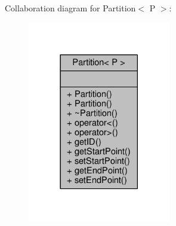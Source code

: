 Collaboration diagram for Partition$<$ P $>$\+:\nopagebreak
\begin{figure}[H]
\begin{center}
\leavevmode
\includegraphics[width=177pt]{classPartition__coll__graph}
\end{center}
\end{figure}
